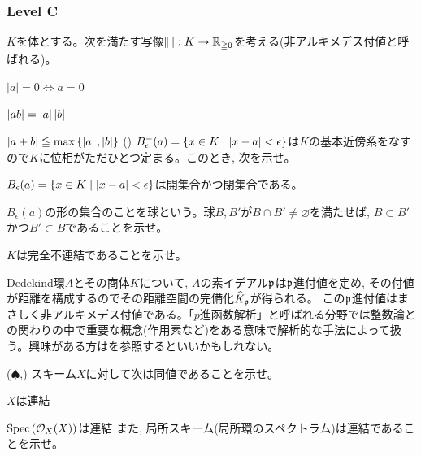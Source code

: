 \subsubsection{Level C}
\begin{prob}
$K$を体とする。次を満たす写像$\left\|  \right\|:K\to \mathbb{R}_{\geqq 0}$を考える(非アルキメデス付値と呼ばれる)。
\ben[label=(\roman*)]
\item $|a|= 0 \iff a=0$
\item $\left| ab \right| = \left| a \right|\left| b \right|$
\item $\left| a+b \right| \leqq \max{\{  \left| a \right| ,  \left| b \right| \}}$ ()
\een
$B_{\epsilon}^{-}(a) = \{ x\in K \mid \left| x-a \right| < \epsilon \}$は$K$の基本近傍系をなすので$K$に位相がただひとつ定まる。このとき, 次を示せ。
\ben
\item $B_{\epsilon}(a) = \{ x\in K\mid \left| x-a \right| < \epsilon \}$は開集合かつ閉集合である。
\item $B_{\epsilon}(a)$の形の集合のことを球という。球$B,B'$が$B\cap B' \neq \varnothing$を満たせば, $B\subset B'$かつ$B'\subset B$であることを示せ。
\item $K$は完全不連結であることを示せ。
\een
\end{prob}
\begin{hint}
\end{hint}
\begin{rem}
Dedekind環$A$とその商体$K$について, $A$の素イデアル$\mathfrak{p}$は$\mathfrak{p}$進付値を定め, その付値が距離を構成するのでその距離空間の完備化$\widehat{K}_{\mathfrak{p}}$が得られる。 この$\mathfrak{p}$進付値はまさしく非アルキメデス付値である。「$p$進函数解析」と呼ばれる分野では整数論との関わりの中で重要な概念(作用素など)をある意味で解析的な手法によって扱う。興味がある方は\cite{nfa}を参照するといいかもしれない。
\end{rem}

\begin{prob} ($\spadesuit$,\cite{liu})
スキーム$X$に対して次は同値であることを示せ。
\ben
\item $X$は連結
\item $\mathrm{Spec}\left( \mathcal{O}_{X}(X) \right)$は連結
\een
また, 局所スキーム(局所環のスペクトラム)は連結であることを示せ。
\end{prob}
\begin{hint}
\end{hint}
